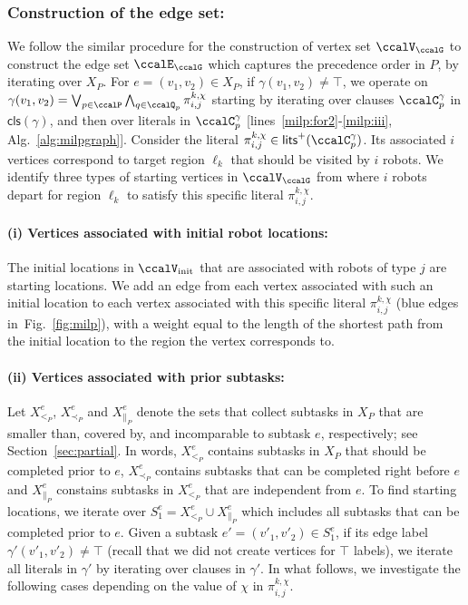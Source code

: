 \documentclass[Afour,sageh,times]{sagej}
\newcommand{\clause}[1]{\mathsf{cls}(#1)}
\renewcommand{\ap}[3]{\mathcal{\pi}_{{#1},{#2}}^{#3}}
\begin{document}
\subsubsection{Construction of  the edge set:}\label{sec:edge_set} We follow the similar procedure for the construction of vertex set $\ccalV_\ccalG$ to construct the edge set $\ccalE_\ccalG$ which captures the precedence order in ${P}$, by iterating over $X_P$. For $e = (v_1, v_2) \in X_{P}$, if $\gamma(v_1, v_2) \not=\top$, we operate on $\gamma(v_1, v_2) =  \bigvee_{p\in \ccalP} \bigwedge_{q \in \ccalQ_{p}} \ap{i}{j}{k,\chi}$ starting by iterating over clauses $\ccalC_p^{\gamma}$ in $\clause{\gamma}$, and then over literals in $\ccalC_p^\gamma$ [lines~\ref{milp:for2}-\ref{milp:iii}, Alg.~\ref{alg:milpgraph}]. Consider the literal $\ap{i}{j}{k,\chi} \in \mathsf{lits}^+(\ccalC_p^{\gamma})$. Its associated $i$ vertices correspond to target region $\ell_k$ that should be visited by $i$ robots. We identify three types of starting vertices in $\ccalV_\ccalG$ from where $i$ robots depart for region $\ell_k$ to satisfy this specific literal $\ap{i}{j}{k,\chi}$.
\paragraph{(i) Vertices associated with initial robot locations:}\label{sec:a} The initial locations in $\ccalV_{\text{init}}$ that are associated with  robots of type $j$ are starting locations. We add an edge from each vertex associated with such an initial location to each vertex associated with this specific literal $\ap{i}{j}{k,\chi}$ (blue edges in~Fig.~\ref{fig:milp}), with a weight equal to the length of the shortest path from the initial location to the region the vertex corresponds to.
\paragraph{(ii) Vertices associated with prior subtasks:}\label{sec:b} Let $X^e_{<_{P}}$, $X^e_{\prec_{P}}$ and $X^e_{\|_{P}}$ denote the sets that collect subtasks in $X_{P}$ that are  smaller than, covered by, and incomparable to subtask $e$, respectively; see Section~\ref{sec:partial}. In words, $X^e_{<_{P}}$ contains subtasks in $X_P$ that should be completed prior to $e$, $X^e_{\prec_{P}}$ contains subtasks that can be completed right before $e$  and $X^e_{\|_{P}}$ constains subtasks in  $X^e_{<_P}$ that are independent from $e$. To find starting locations, we iterate over $S_1^e = X^e_{<_{P}} \cup X^e_{\|_{P}}$ which includes all subtasks that can be completed prior to $e$.
Given a subtask $e' = (v'_1, v'_2) \in S_1^e$, if its edge label $\gamma'(v'_1, v'_2) \not=\top$ (recall that we did not create vertices for $\top$ labels), we iterate all literals in $\gamma'$ by iterating over clauses in $\gamma'$. In what follows, we investigate the following cases depending on the value of $\chi$ in $\ap{i}{j}{k,\chi}$.
\end{document}
